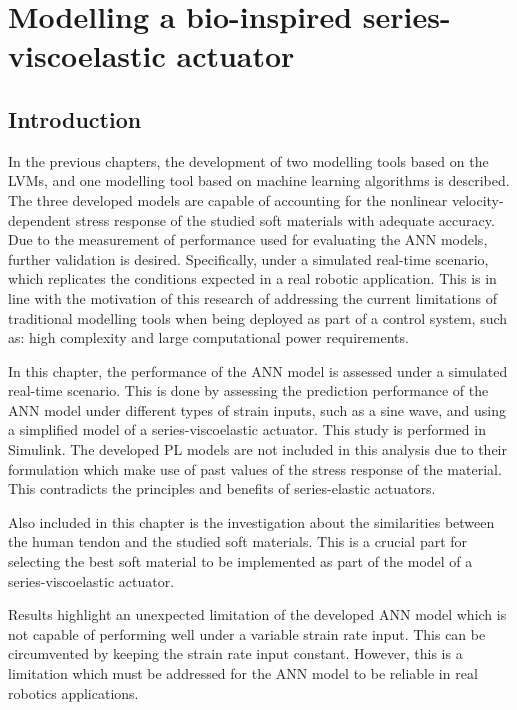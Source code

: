 \chapter{Modelling a bio-inspired series-viscoelastic actuator} \label{ch7:ModelingBio}

\section{Introduction}

In the previous chapters, the development of two modelling tools based on the LVMs, and one modelling tool based on machine learning algorithms is described. The three developed models are capable of accounting for the nonlinear velocity-dependent stress response of the studied soft materials with adequate accuracy. Due to the measurement of performance used for evaluating the ANN models, further validation is desired. Specifically, under a simulated real-time scenario, which replicates the conditions expected in a real robotic application. This is in line with the motivation of this research of addressing the current limitations of traditional modelling tools when being deployed as part of a control system, such as: high complexity and large computational power requirements.

In this chapter, the performance of the ANN model is assessed under a simulated real-time scenario. This is done by assessing the prediction performance of the ANN model under different types of strain inputs, such as a sine wave, and using a simplified model of a series-viscoelastic actuator. This study is performed in Simulink. The developed PL models are not included in this analysis due to their formulation which make use of past values of the stress response of the material. This contradicts the principles and benefits of series-elastic actuators.

Also included in this chapter is the investigation about the similarities between the human tendon and the studied soft materials. This is a crucial part for selecting the best soft material to be implemented as part of the model of a series-viscoelastic actuator. 

Results highlight an unexpected limitation of the developed ANN model which is not capable of performing well under a variable strain rate input. This can be circumvented by keeping the strain rate input constant. However, this is a limitation which must be addressed for the ANN model to be reliable in real robotics applications.

